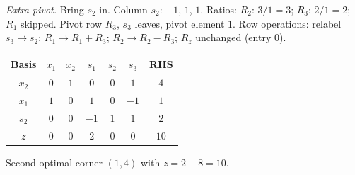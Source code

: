 \begin{solutions}
        \emph{Extra pivot.} Bring $s_2$ in. Column $s_2$: $-1$, $1$, $1$.
        Ratios: $R_2$: $3/1=3$; $R_3$: $2/1=2$; $R_1$ skipped. Pivot row
        $R_3$, $s_3$ leaves, pivot element $1$. Row operations: relabel
        $s_3\to s_2$; $R_1\to R_1+R_3$; $R_2\to R_2-R_3$; $R_z$ unchanged
        (entry $0$).
        \begin{center}
        \begin{tabular}{c|ccccc|c}
        Basis & $x_1$ & $x_2$ & $s_1$ & $s_2$ & $s_3$ & RHS\\
        \hline
        $x_2$ & $0$ & $1$ & $0$ & $0$ & $1$ & $4$\\
        $x_1$ & $1$ & $0$ & $1$ & $0$ & $-1$ & $1$\\
        $s_2$ & $0$ & $0$ & $-1$ & $1$ & $1$ & $2$\\
        \hline
        $z$ & $0$ & $0$ & $2$ & $0$ & $0$ & $10$\\
        \end{tabular}
        \end{center}
        Second optimal corner $(1,4)$ with $z=2+8=10$.


\end{solutions}

